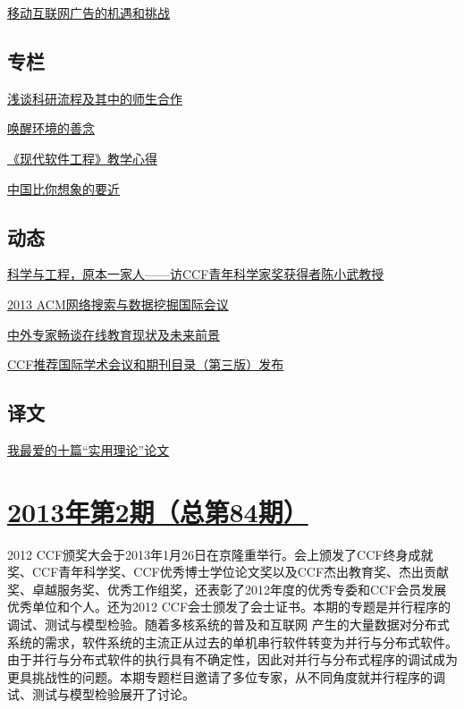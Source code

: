 \documentclass[a4paper]{article}
\begin{document}
\href{http://history.ccf.org.cn/resources/1190201776262/2013/03/15/6.pdf}{移动互联网广告的机遇和挑战}

\subsection{专栏}
\href{http://history.ccf.org.cn/resources/1190201776262/2013/03/15/7.pdf}{浅谈科研流程及其中的师生合作}

\href{http://history.ccf.org.cn/resources/1190201776262/2013/03/15/8.pdf}{唤醒环境的善念}

\href{http://history.ccf.org.cn/resources/1190201776262/2013/03/15/9.pdf}{《现代软件工程》教学心得}

\href{http://history.ccf.org.cn/resources/1190201776262/2013/03/15/10.pdf}{中国比你想象的要近}

\subsection{动态}
\href{http://history.ccf.org.cn/resources/1190201776262/2013/03/15/11.pdf}{科学与工程，原本一家人——访CCF青年科学家奖获得者陈小武教授}

\href{http://history.ccf.org.cn/resources/1190201776262/2013/03/15/12.pdf}{2013 ACM网络搜索与数据挖掘国际会议}

\href{http://history.ccf.org.cn/resources/1190201776262/2013/03/15/13.pdf}{中外专家畅谈在线教育现状及未来前景}

\href{http://history.ccf.org.cn/resources/1190201776262/2013/03/15/15.pdf}{CCF推荐国际学术会议和期刊目录（第三版）发布}

\subsection{译文}
\href{http://history.ccf.org.cn/resources/1190201776262/2013/03/15/14.pdf}{我最爱的十篇“实用理论”论文}


\section{\href{http://history.ccf.org.cn/sites/ccf/jsjtbbd.jsp?contentId=2722092546435}{\textbf{2013年第2期（总第84期）}}}
2012 CCF颁奖大会于2013年1月26日在京隆重举行。会上颁发了CCF终身成就奖、CCF青年科学奖、CCF优秀博士学位论文奖以及CCF杰出教育奖、杰出贡献奖、卓越服务奖、优秀工作组奖，还表彰了2012年度的优秀专委和CCF会员发展优秀单位和个人。还为2012 CCF会士颁发了会士证书。本期的专题是并行程序的调试、测试与模型检验。随着多核系统的普及和互联网
产生的大量数据对分布式系统的需求，软件系统的主流正从过去的单机串行软件转变为并行与分布式软件。由于并行与分布式软件的执行具有不确定性，因此对并行与分布式程序的调试成为更具挑战性的问题。本期专题栏目邀请了多位专家，从不同角度就并行程序的调试、测试与模型检验展开了讨论。
\end{document}
